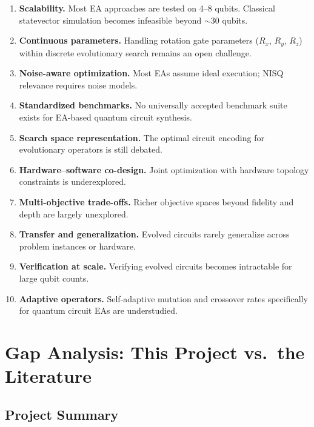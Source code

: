 \documentclass[11pt]{article}
\begin{document}
\begin{enumerate}
    \item \textbf{Scalability.} Most EA approaches are tested on 4--8 qubits. Classical statevector simulation becomes infeasible beyond ${\sim}30$ qubits.
    \item \textbf{Continuous parameters.} Handling rotation gate parameters ($R_x$, $R_y$, $R_z$) within discrete evolutionary search remains an open challenge.
    \item \textbf{Noise-aware optimization.} Most EAs assume ideal execution; NISQ relevance requires noise models.
    \item \textbf{Standardized benchmarks.} No universally accepted benchmark suite exists for EA-based quantum circuit synthesis.
    \item \textbf{Search space representation.} The optimal circuit encoding for evolutionary operators is still debated.
    \item \textbf{Hardware--software co-design.} Joint optimization with hardware topology constraints is underexplored.
    \item \textbf{Multi-objective trade-offs.} Richer objective spaces beyond fidelity and depth are largely unexplored.
    \item \textbf{Transfer and generalization.} Evolved circuits rarely generalize across problem instances or hardware.
    \item \textbf{Verification at scale.} Verifying evolved circuits becomes intractable for large qubit counts.
    \item \textbf{Adaptive operators.} Self-adaptive mutation and crossover rates specifically for quantum circuit EAs are understudied.
\end{enumerate}

\section{Gap Analysis: This Project vs.\ the Literature}
\label{sec:gap}

\subsection{Project Summary}
\end{document}
